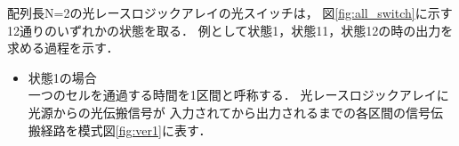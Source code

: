 配列長N=2の光レースロジックアレイの光スイッチは，
図\ref{fig:all_switch}に示す12通りのいずれかの状態を取る．
例として状態1，状態11，状態12の時の出力を求める過程を示す．
\begin{itemize}
\item 状態1の場合\\
一つのセルを通過する時間を1区間と呼称する．
光レースロジックアレイに光源からの光伝搬信号が
入力されてから出力されるまでの各区間の信号伝搬経路を模式図\ref{fig:ver1}に表す．
\begin{figure}[t!]
\begin{center}
\end{center}
\end{figure}
\end{itemize}
